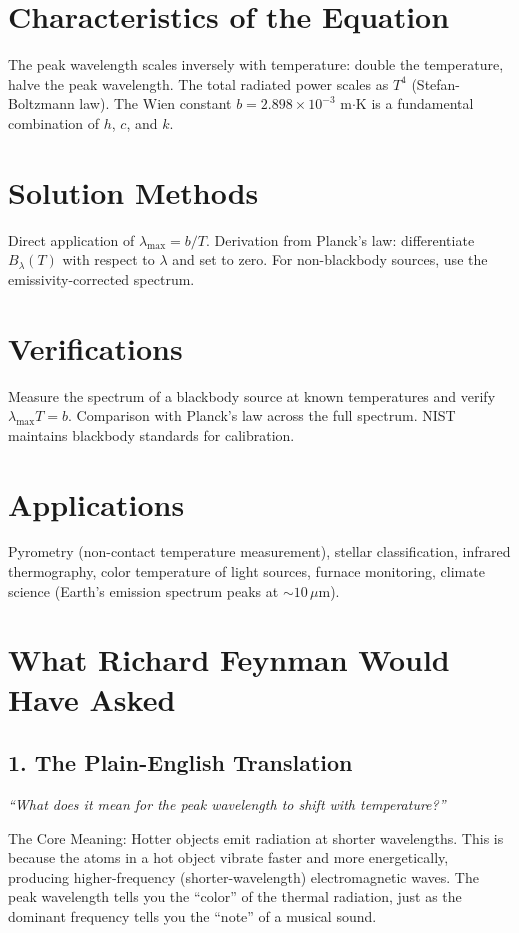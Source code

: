 \section*{Characteristics of the Equation}

The peak wavelength scales inversely with temperature: double the temperature, halve the peak wavelength. The total radiated power scales as $T^4$ (Stefan-Boltzmann law). The Wien constant $b = 2.898 \times 10^{-3}$ m$\cdot$K is a fundamental combination of $h$, $c$, and $k$.
\section*{Solution Methods}

Direct application of $\lambda_{\max} = b/T$. Derivation from Planck's law: differentiate $B_\lambda(T)$ with respect to $\lambda$ and set to zero. For non-blackbody sources, use the emissivity-corrected spectrum.
\section*{Verifications}

Measure the spectrum of a blackbody source at known temperatures and verify $\lambda_{\max} T = b$. Comparison with Planck's law across the full spectrum. NIST maintains blackbody standards for calibration.
\section*{Applications}

Pyrometry (non-contact temperature measurement), stellar classification, infrared thermography, color temperature of light sources, furnace monitoring, climate science (Earth's emission spectrum peaks at $\sim 10\,\mu$m).
\section*{What Richard Feynman Would Have Asked}

\subsection*{1. The Plain-English Translation}
\textit{``What does it mean for the peak wavelength to shift with temperature?''}

The Core Meaning: Hotter objects emit radiation at shorter wavelengths. This is because the atoms in a hot object vibrate faster and more energetically, producing higher-frequency (shorter-wavelength) electromagnetic waves. The peak wavelength tells you the ``color'' of the thermal radiation, just as the dominant frequency tells you the ``note'' of a musical sound.

